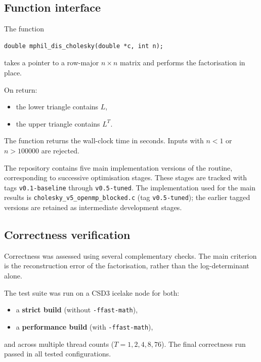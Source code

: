 \documentclass{article}
\begin{document}
\subsection{Function interface}

The function
\begin{verbatim}
double mphil_dis_cholesky(double *c, int n);
\end{verbatim}
takes a pointer to a row-major $n \times n$ matrix and performs the
factorisation in place.

On return:
\begin{itemize}
  \item the lower triangle contains $L$,
  \item the upper triangle contains $L^T$.
\end{itemize}

The function returns the wall-clock time in seconds. Inputs with
$n < 1$ or $n > 100000$ are rejected.

The repository contains five main implementation versions of the routine,
corresponding to successive optimisation stages. These stages are tracked
with tags \texttt{v0.1-baseline} through \texttt{v0.5-tuned}.
The implementation used for the main results is
\texttt{cholesky\_v5\_openmp\_blocked.c} (tag \texttt{v0.5-tuned});
the earlier tagged versions are retained as intermediate development
stages.

\subsection{Correctness verification}

Correctness was assessed using several complementary checks.
The main criterion is the reconstruction error of the factorisation,
rather than the log-determinant alone.

The test suite was run on a CSD3 icelake node for both:
\begin{itemize}
  \item a \textbf{strict build} (without \texttt{-ffast-math}),
  \item a \textbf{performance build} (with \texttt{-ffast-math}),
\end{itemize}
and across multiple thread counts ($T = 1, 2, 4, 8, 76$).
The final correctness run passed in all tested configurations.
\end{document}
